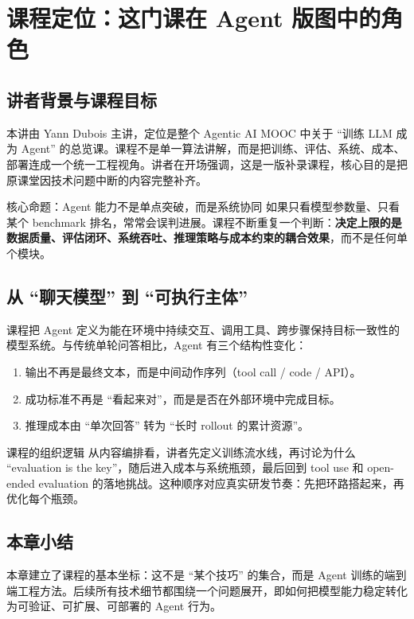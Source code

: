 \section{课程定位：这门课在 Agent 版图中的角色}

\subsection{讲者背景与课程目标}
本讲由 Yann Dubois 主讲，定位是整个 Agentic AI MOOC 中关于 ``训练 LLM 成为 Agent'' 的总览课。课程不是单一算法讲解，而是把训练、评估、系统、成本、部署连成一个统一工程视角。讲者在开场强调，这是一版补录课程，核心目的是把原课堂因技术问题中断的内容完整补齐。

\begin{importantbox}{核心命题：Agent 能力不是单点突破，而是系统协同}
如果只看模型参数量、只看某个 benchmark 排名，常常会误判进展。课程不断重复一个判断：\textbf{决定上限的是数据质量、评估闭环、系统吞吐、推理策略与成本约束的耦合效果}，而不是任何单个模块。
\end{importantbox}

\subsection{从 ``聊天模型'' 到 ``可执行主体''}
课程把 Agent 定义为能在环境中持续交互、调用工具、跨步骤保持目标一致性的模型系统。与传统单轮问答相比，Agent 有三个结构性变化：
\begin{enumerate}
    \item 输出不再是最终文本，而是中间动作序列（tool call / code / API）。
    \item 成功标准不再是 ``看起来对''，而是是否在外部环境中完成目标。
    \item 推理成本由 ``单次回答'' 转为 ``长时 rollout 的累计资源''。
\end{enumerate}

\begin{knowledgebox}{课程的组织逻辑}
从内容编排看，讲者先定义训练流水线，再讨论为什么 ``evaluation is the key''，随后进入成本与系统瓶颈，最后回到 tool use 和 open-ended evaluation 的落地挑战。这种顺序对应真实研发节奏：先把环路搭起来，再优化每个瓶颈。
\end{knowledgebox}

\subsection{本章小结}
本章建立了课程的基本坐标：这不是 ``某个技巧'' 的集合，而是 Agent 训练的端到端工程方法。后续所有技术细节都围绕一个问题展开，即如何把模型能力稳定转化为可验证、可扩展、可部署的 Agent 行为。


